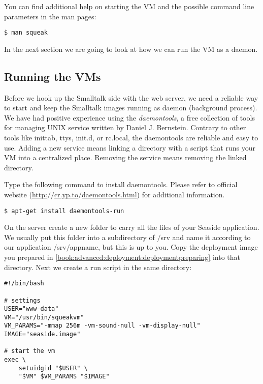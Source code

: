 \documentclass[a4paper,10pt,twoside]{book}
\newcommand{\ct}[1]{{\small\ttfamily\textup{#1}}}
\begin{document}
You can find additional help on starting the VM and the possible command line parameters in the man pages:

\begin{lstlisting}
$ man squeak
\end{lstlisting}

In the next section we are going to look at how we can run the VM as a daemon.

\subsection{Running the VMs}
\label{book:advanced:deployment:deploymentapache:runvm}

Before we hook up the Smalltalk side with the web server, we need a reliable way to start and keep the Smalltalk images running as daemon (background process). We have had positive experience using the \textit{daemontools}, a free collection of tools for managing UNIX service written by Daniel J. Bernstein. Contrary to other tools like \ct{inittab}, \ct{ttys}, \ct{init.d}, or \ct{rc.local}, the \ct{daemontools} are reliable and easy to use. Adding a new service means linking a directory with a script that runs your VM into a centralized place. Removing the service means removing the linked directory.

Type the following command to install daemontools. Please refer to official website (\href{http://cr.yp.to/daemontools.html}{http:$/$$/$cr.yp.to$/$daemontools.html}) for additional information.

\begin{lstlisting}
$ apt-get install daemontools-run
\end{lstlisting}

On the server create a new folder to carry all the files of your Seaside application. We usually put this folder into a subdirectory of \ct{$/$srv} and name it according to our application \ct{$/$srv$/$appname}, but this is up to you. Copy the deployment image you prepared in \autoref{book:advanced:deployment:deploymentpreparing} into that directory. Next we create a \ct{run} script in the same directory:

\begin{lstlisting}
#!/bin/bash

# settings
USER="www-data"
VM="/usr/bin/squeakvm"
VM_PARAMS="-mmap 256m -vm-sound-null -vm-display-null"
IMAGE="seaside.image"

# start the vm
exec \
    setuidgid "$USER" \
    "$VM" $VM_PARAMS "$IMAGE"
\end{lstlisting}
\end{document}
